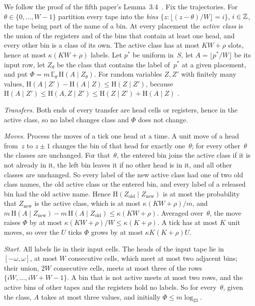 \begin{outline}
We follow the proof of the fifth paper's Lemma~3.4~\cite{DirectedRecovery2026}. Fix the trajectories. For
$\theta\in\{0,\dots,W-1\}$ partition every tape into the \emph{bins} $\{z:\lfloor(z-\theta)/W\rfloor=i\}$, $i\in\mathbb{Z}$, the
tape being part of the name of a bin. At every placement the \emph{active class} is the union of the registers and of
the bins that contain at least one head, and every other bin is a class of its own. The active class has at most
$KW+\rho$ slots, hence at most $\kappa(KW+\rho)$ labels. Let $p^*$ be uniform in~$S$, let $A=\lfloor p^*/W\rfloor$ be
its input row, let $Z_\theta$ be the class that contains the label of~$p^*$ at a given placement, and put
$\Phi=m\,\mathbb E_\theta\,\mathrm H(A\mid Z_\theta)$. For random variables $Z,Z'$ with finitely many values,
$\mathrm H(A\mid Z')-\mathrm H(A\mid Z)\le\mathrm H(Z\mid Z')$, because
$\mathrm H(A\mid Z')\le\mathrm H(A,Z\mid Z')\le\mathrm H(Z\mid Z')+\mathrm H(A\mid Z)$
\cite[(3.6)]{DirectedRecovery2026}.

\emph{Transfers.} Both ends of every transfer are head cells or registers, hence in the active class, so no label
changes class and $\Phi$ does not change.

\emph{Moves.} Process the moves of a tick one head at a time. A unit move of a head from~$z$ to $z\pm1$ changes the bin
of that head for exactly one~$\theta$; for every other~$\theta$ the classes are unchanged. For that~$\theta$, the
entered bin joins the active class if it is not already in it, the left bin leaves it if no other head is in it, and all
other classes are unchanged. So every label of the new active class had one of two old class names, the old active class
or the entered bin, and every label of a released bin had the old active name. Hence
$\mathrm H(Z_{\mathrm{old}}\mid Z_{\mathrm{new}})$ is at most the probability that $Z_{\mathrm{new}}$ is the active
class, which is at most $\kappa(KW+\rho)/m$, and
$m\,\mathrm H(A\mid Z_{\mathrm{new}})-m\,\mathrm H(A\mid Z_{\mathrm{old}})\le\kappa(KW+\rho)$. Averaged over~$\theta$,
the move raises $\Phi$ by at most $\kappa(KW+\rho)/W\le\kappa(K+\rho)$. A tick has at most $K$ unit moves, so over the
$U$ ticks $\Phi$ grows by at most $\kappa K(K+\rho)U$.

\emph{Start.} All labels lie in their input cells. The heads of the input tape lie in $[-\omega,\omega]$, at most $W$
consecutive cells, which meet at most two adjacent bins; their union, $2W$ consecutive cells, meets at most three of the
rows $\{iW,\dots,iW+W-1\}$. A bin that is not active meets at most two rows, and the active bins of other tapes and the
registers hold no labels. So for every~$\theta$, given the class, $A$ takes at most three values, and initially
$\Phi\le m\log_23$.


\end{outline}
